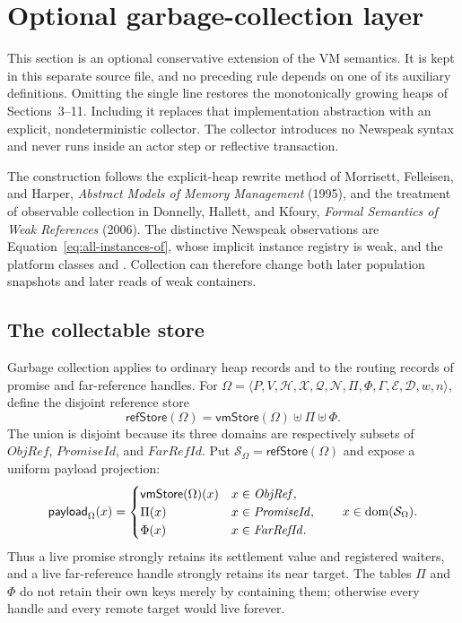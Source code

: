 \section{Optional garbage-collection layer}
\label{sec:garbage-collection}

This section is an optional conservative extension of the VM semantics.  It is
kept in this separate source file, and no preceding rule depends on one of its
auxiliary definitions.  Omitting the single
\verb|| line restores the monotonically growing heaps of
Sections~3--11.  Including it replaces that implementation abstraction with an
explicit, nondeterministic collector.  The collector introduces no Newspeak
syntax and never runs inside an actor step or reflective transaction.

The construction follows the explicit-heap rewrite method of Morrisett,
Felleisen, and Harper, \emph{Abstract Models of Memory Management} (1995), and
the treatment of observable collection in Donnelly, Hallett, and Kfoury,
\emph{Formal Semantics of Weak References} (2006).  The distinctive Newspeak
observations are Equation~\eqref{eq:all-instances-of}, whose implicit instance
registry is weak, and the platform classes  and .
Collection can therefore change both later population snapshots and later
reads of weak containers.

\subsection{The collectable store}

Garbage collection applies to ordinary heap records and to the routing records
of promise and far-reference handles.  For
$\Omega=\langle P,V,\mathcal H,\mathcal X,\mathcal Q,\mathcal N,
\Pi,\Phi,\Gamma,\mathcal E,\mathcal D,w,n\rangle$, define the disjoint reference
store
\begin{equation}\label{eq:gc-reference-store}
 \mathsf{refStore}(\Omega)
   =\mathsf{vmStore}(\Omega)\uplus\Pi\uplus\Phi.
\end{equation}
The union is disjoint because its three domains are respectively subsets of
$\mathit{ObjRef}$, $\mathit{PromiseId}$, and $\mathit{FarRefId}$.  Put
$\mathcal S_\Omega=\mathsf{refStore}(\Omega)$ and expose a uniform payload
projection:
\begin{equation}\label{eq:gc-reference-payload}
 \mathsf{payload}_{\Omega}(x)=
 \begin{cases}
  \mathsf{vmStore}(\Omega)(x) & x\in\mathit{ObjRef},\\
  \Pi(x) & x\in\mathit{PromiseId},\\
  \Phi(x) & x\in\mathit{FarRefId}.
 \end{cases}
 \qquad x\in\mathop{\mathrm{dom}}(\mathcal S_\Omega).
\end{equation}
Thus a live promise strongly retains its settlement value and registered
waiters, and a live far-reference handle strongly retains its near target.
The tables $\Pi$ and $\Phi$ do not retain their own keys merely by containing
them; otherwise every handle and every remote target would live forever.

